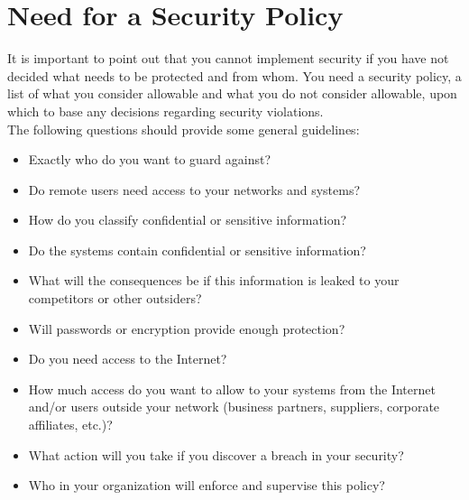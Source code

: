 \documentclass[10pt,a4paper]{article}
\begin{document}
\newpage
\section{Need for a Security Policy}
It is important to point out that you cannot implement security if you have not
decided what needs to be protected and from whom. You need a security policy, a
list of what you consider allowable and what you do not consider allowable, upon
which to base any decisions regarding security violations.
\\
The following questions should provide some
general guidelines:
\\
\begin{itemize}
\item Exactly who do you want to guard against?
\item Do remote users need access to your networks and systems?
\item How do you classify confidential or sensitive information?
\item Do the systems contain confidential or sensitive information?
\item What will the consequences be if this information is leaked to your competitors or other outsiders?
\item Will passwords or encryption provide enough protection?
\item Do you need access to the Internet?
\item How much access do you want to allow to your systems from the Internet
and/or users outside your network (business partners, suppliers, corporate
affiliates, etc.)?
\item What action will you take if you discover a breach in your security?
\item Who in your organization will enforce and supervise this policy?
\end{itemize}
\end{document}
